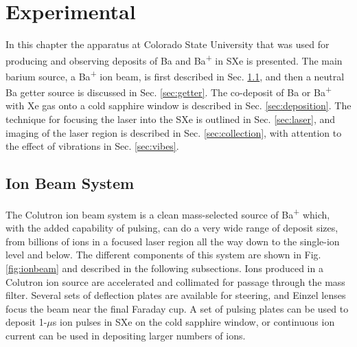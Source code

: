 \chapter{Experimental}



In this chapter the apparatus at Colorado State University that was used for producing and observing  deposits of Ba and Ba\textsuperscript{+} in SXe is presented.  The main barium source, a Ba\textsuperscript{+} ion beam, is first described in Sec. \ref{sec:ionbeam}, and then a neutral Ba getter source is discussed in Sec. \ref{sec:getter}.  The co-deposit of Ba or Ba\textsuperscript{+} with Xe gas onto a cold sapphire window is described in Sec. \ref{sec:deposition}.  The technique for focusing the laser into the SXe is outlined in Sec. \ref{sec:laser}, and imaging of the laser region is described in Sec. \ref{sec:collection}, with attention to the effect of vibrations in Sec. \ref{sec:vibes}.

\section{Ion Beam System}
\label{sec:ionbeam}

The Colutron \cite{ColutronCompany} ion beam system is a clean mass-selected source of Ba\textsuperscript{+} which, with the added capability of pulsing, can do a very wide range of deposit sizes, from billions of ions in a focused laser region all the way down to the single-ion level and below.  The different components of this system are shown in Fig. \ref{fig:ionbeam} and described in the following subsections.  Ions produced in a Colutron ion source are accelerated and collimated for passage through the mass filter.  Several sets of deflection plates are available for steering, and Einzel lenses focus the beam near the final Faraday cup.  A set of pulsing plates can be used to deposit 1-$\mu$s ion pulses in SXe on the cold sapphire window, or continuous ion current can be used in depositing larger numbers of ions.

\vspace{20mm}


